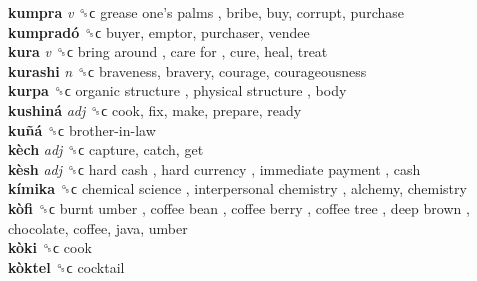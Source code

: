 \textbf{kumpra} \emph{v}  ␝ϲ   grease one’s palms , bribe, buy, corrupt, purchase  \\
\textbf{kumpradó} ␝ϲ  buyer, emptor, purchaser, vendee  \\
\textbf{kura} \emph{v}  ␝ϲ   bring around ,  care for , cure, heal, treat  \\
\textbf{kurashi} \emph{n}  ␝ϲ  braveness, bravery, courage, courageousness  \\
\textbf{kurpa} ␝ϲ   organic structure ,  physical structure , body  \\
\textbf{kushiná} \emph{adj}  ␝ϲ  cook, fix, make, prepare, ready  \\
\textbf{kuñá} ␝ϲ   brother-in-law   \\
\textbf{kèch} \emph{adj}  ␝ϲ  capture, catch, get  \\
\textbf{kèsh} \emph{adj}  ␝ϲ   hard cash ,  hard currency ,  immediate payment , cash  \\
\textbf{kímika} ␝ϲ   chemical science ,  interpersonal chemistry , alchemy, chemistry  \\
\textbf{kòfi} ␝ϲ   burnt umber ,  coffee bean ,  coffee berry ,  coffee tree ,  deep brown , chocolate, coffee, java, umber  \\
\textbf{kòki} ␝ϲ  cook  \\
\textbf{kòktel} ␝ϲ  cocktail  \\
